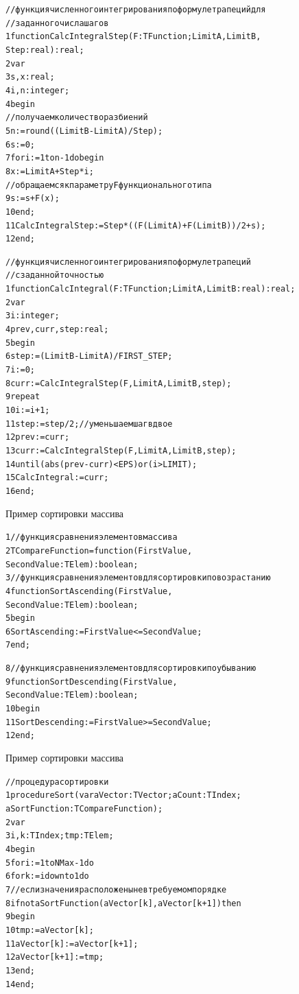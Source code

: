 \documentclass{beamer}
\begin{document}
\begin{frame}[fragile]
\begin{alltt}
//функция численного интегрирования по формуле трапеций для 
//  заданного числа шагов
1 function CalcIntegralStep(F: TFunction; LimitA, LimitB,
     Step: real): real;
2 var
3   s, x: real;  
4   i, n: integer;
4 begin
//получаем количество разбиений
5   n := round((LimitB - LimitA) / Step); 
6   s := 0;  
7   for i := 1 to n - 1 do begin
8     x := LimitA + Step * i;    
//обращаемся к параметру F функционального типа 
9     s := s + F(x); 
10  end;
11  CalcIntegralStep := Step*((F(LimitA)+F(LimitB))/2+s);
12 end;  
\end{alltt}
\end{frame}

\begin{frame}[fragile]
\begin{alltt}
//функция численного интегрирования по формуле трапеций 
//  с заданной точностью
1 function CalcIntegral(F:TFunction;LimitA,LimitB:real):real;
2 var
3  i: integer; 
4  prev, curr, step: real; 
5 begin  
6  step := (LimitB - LimitA) / FIRST_STEP;    
7  i := 0;
8  curr := CalcIntegralStep(F, LimitA, LimitB, step);
9  repeat
10   i := i + 1;       
11   step := step / 2; //уменьшаем шаг вдвое
12   prev := curr;     
13    curr := CalcIntegralStep(F, LimitA, LimitB, step);    
14  until (abs(prev - curr) < EPS) or (i > LIMIT);  
15  CalcIntegral := curr;
16 end;  
\end{alltt}
\end{frame}

\begin{frame}[fragile]{Пример сортировки массива}
\begin{alltt}
 1 //функция сравнения элементов массива
 2  TCompareFunction = function(FirstValue, 
       SecondValue: TElem):boolean;
 3 //функция сравнения элементов для сортировки по возрастанию
 4 function SortAscending(FirstValue, 
     SecondValue: TElem):boolean;
 5 begin
 6   SortAscending := FirstValue <= SecondValue;
 7 end;

 8 //функция сравнения элементов для сортировки по убыванию
 9 function SortDescending(FirstValue, 
     SecondValue: TElem):boolean;
10 begin
11  SortDescending := FirstValue >= SecondValue;
12 end;
\end{alltt}
\end{frame}

\begin{frame}[fragile]{Пример сортировки массива}
\begin{alltt}
//процедура сортировки
1 procedure Sort(var aVector: TVector; aCount: TIndex;
     aSortFunction: TCompareFunction);
2 var 
3    i, k : TIndex; tmp: TElem;
4 begin
5   for i:=1 to NMax-1 do
6     for k:=i downto 1 do
7       //если значения расположены не в требуемом порядке
8        if not aSortFunction(aVector[k], aVector[k+1]) then
9       begin
10          tmp := aVector[k];
11          aVector[k] := aVector[k + 1];
12          aVector[k + 1] := tmp;
13         end;
14 end;
\end{alltt}
\end{frame}
\end{document}
